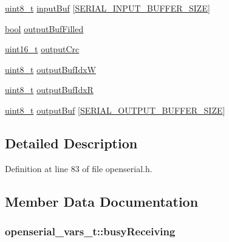 \begin{DoxyCompactItemize}
\item 
\hyperlink{_p_e___types_8h_aba7bc1797add20fe3efdf37ced1182c5}{uint8\+\_\+t} \hyperlink{structopenserial__vars__t_a41701302af4b1165f480d54d9ebef6d9}{input\+Buf} \mbox{[}\hyperlink{group___open_serial_ga8221a6836587db0f71d30e1da1c1bab3}{S\+E\+R\+I\+A\+L\+\_\+\+I\+N\+P\+U\+T\+\_\+\+B\+U\+F\+F\+E\+R\+\_\+\+S\+I\+ZE}\mbox{]}
\item 
\hyperlink{_p_e___types_8h_a97a80ca1602ebf2303258971a2c938e2}{bool} \hyperlink{structopenserial__vars__t_ac1d8a23992e69cea511d5336e2d04df4}{output\+Buf\+Filled}
\item 
\hyperlink{_p_e___types_8h_a1f1825b69244eb3ad2c7165ddc99c956}{uint16\+\_\+t} \hyperlink{structopenserial__vars__t_accd7c880a97b11c47d8d0c80df9a9a95}{output\+Crc}
\item 
\hyperlink{_p_e___types_8h_aba7bc1797add20fe3efdf37ced1182c5}{uint8\+\_\+t} \hyperlink{structopenserial__vars__t_a1f9a1d728df39d695458bdcb8fd4d0d9}{output\+Buf\+IdxW}
\item 
\hyperlink{_p_e___types_8h_aba7bc1797add20fe3efdf37ced1182c5}{uint8\+\_\+t} \hyperlink{structopenserial__vars__t_a1f210c5c7efe803f967a9f152f700c6f}{output\+Buf\+IdxR}
\item 
\hyperlink{_p_e___types_8h_aba7bc1797add20fe3efdf37ced1182c5}{uint8\+\_\+t} \hyperlink{structopenserial__vars__t_a3f88c7c284a6a3dce9bb67ced44a9da3}{output\+Buf} \mbox{[}\hyperlink{group___open_serial_gabfe80eb43785493f268187a201692d8e}{S\+E\+R\+I\+A\+L\+\_\+\+O\+U\+T\+P\+U\+T\+\_\+\+B\+U\+F\+F\+E\+R\+\_\+\+S\+I\+ZE}\mbox{]}
\end{DoxyCompactItemize}


\subsection{Detailed Description}


Definition at line 83 of file openserial.\+h.



\subsection{Member Data Documentation}
\subsubsection[{\texorpdfstring{busy\+Receiving}{busyReceiving}}]{ openserial\+\_\+vars\+\_\+t\+::busy\+Receiving}\hypertarget{structopenserial__vars__t_a2e727be840a75735e52424e968c24111}{}\label{structopenserial__vars__t_a2e727be840a75735e52424e968c24111}


